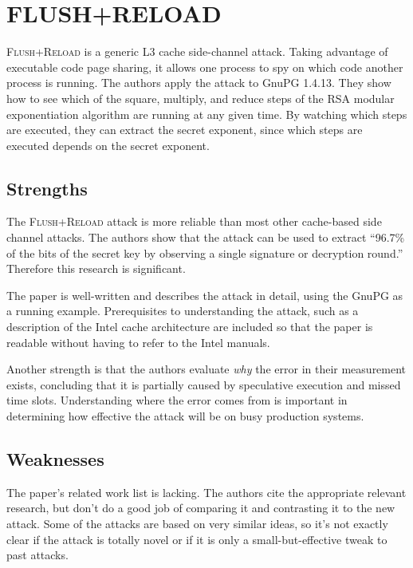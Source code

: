 \documentclass{acm_proc_article-sp}
\begin{document}
\section{FLUSH+RELOAD}


\textsc{Flush+Reload} is a generic L3 cache side-channel attack. Taking
advantage of executable code page sharing, it allows one process to spy on which
code another process is running. The authors apply the attack to GnuPG 1.4.13.
They show how to see which of the square, multiply, and reduce steps of the RSA
modular exponentiation algorithm are running at any given time. By watching
which steps are executed, they can extract the secret exponent, since which
steps are executed depends on the secret exponent.

\subsection{Strengths}

The \textsc{Flush+Reload} attack is more reliable than most other cache-based
side channel attacks. The authors show that the attack can be used to extract
``96.7\% of the bits of the secret key by observing a single signature or
decryption round.'' Therefore this research is significant.

The paper is well-written and describes the attack in detail, using the GnuPG as
a running example. Prerequisites to understanding the attack, such as
a description of the Intel cache architecture are included so that the paper is
readable without having to refer to the Intel manuals.

Another strength is that the authors evaluate \emph{why} the error in their
measurement exists, concluding that it is partially caused by speculative
execution and missed time slots. Understanding where the error comes from is
important in determining how effective the attack will be on busy production
systems.

\subsection{Weaknesses}

The paper's related work list is lacking. The authors cite the appropriate
relevant research, but don't do a good job of comparing it and contrasting it to
the new attack. Some of the attacks are based on very similar ideas, so it's not
exactly clear if the attack is totally novel or if it is only
a small-but-effective tweak to past attacks.
\end{document}
